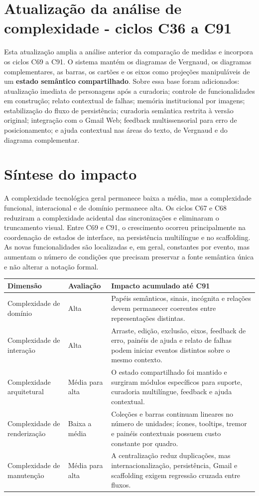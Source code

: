 \documentclass[12pt,a4paper]{article}
\begin{document}
\section*{Atualização da análise de complexidade - ciclos C36 a C91}

Esta atualização amplia a análise anterior da comparação de medidas e incorpora os ciclos C69 a C91. O sistema mantém os diagramas de Vergnaud, os diagramas complementares, as barras, os cartões e os eixos como projeções manipuláveis de um \textbf{estado semântico compartilhado}. Sobre essa base foram adicionados: atualização imediata de personagens após a curadoria; controle de funcionalidades em construção; relato contextual de falhas; memória institucional por imagens; estabilização do fluxo de persistência; curadoria semântica restrita à versão original; integração com o Gmail Web; feedback multissensorial para erro de posicionamento; e ajuda contextual nas áreas do texto, de Vergnaud e do diagrama complementar.

\section{Síntese do impacto}

A complexidade tecnológica geral permanece baixa a média, mas a complexidade funcional, interacional e de domínio permanece alta. Os ciclos C67 e C68 reduziram a complexidade acidental das sincronizações e eliminaram o truncamento visual. Entre C69 e C91, o crescimento ocorreu principalmente na coordenação de estados de interface, na persistência multilíngue e no scaffolding. As novas funcionalidades são localizadas e, em geral, constantes por evento, mas aumentam o número de condições que precisam preservar a fonte semântica única e não alterar a notação formal.

\begin{tabularx}{\textwidth}{p{3.8cm}p{2.8cm}X}
\toprule
\textbf{Dimensão} & \textbf{Avaliação} & \textbf{Impacto acumulado até C91}\\
\midrule
Complexidade de domínio & Alta & Papéis semânticos, sinais, incógnita e relações devem permanecer coerentes entre representações distintas.\\
Complexidade de interação & Alta & Arraste, edição, exclusão, eixos, feedback de erro, painéis de ajuda e relato de falhas podem iniciar eventos distintos sobre o mesmo contexto.\\
Complexidade arquitetural & Média para alta & O estado compartilhado foi mantido e surgiram módulos específicos para suporte, curadoria multilíngue, feedback e ajuda contextual.\\
Complexidade de renderização & Baixa a média & Coleções e barras continuam lineares no número de unidades; ícones, tooltips, tremor e painéis contextuais possuem custo constante por quadro.\\
Complexidade de manutenção & Média para alta & A centralização reduz duplicações, mas internacionalização, persistência, Gmail e scaffolding exigem regressão cruzada entre fluxos.\\
\bottomrule
\end{tabularx}
\end{document}

